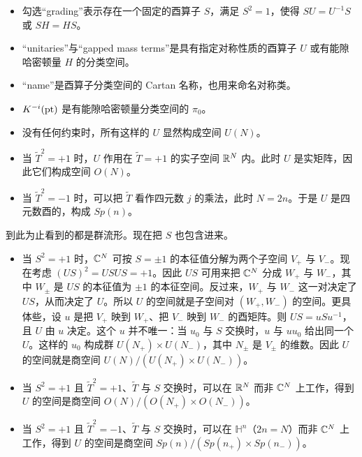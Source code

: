 \begin{itemize}
  \item 勾选“grading”表示存在一个固定的酉算子 $S$，满足 $S^2=1$，使得 $SU=U^{-1}S$ 或 $SH=HS$。
  \item “unitaries”与“gapped mass terms”是具有指定对称性质的酉算子 $U$ 或有能隙哈密顿量 $H$ 的分类空间。
  \item “name”是酉算子分类空间的 Cartan 名称，也用来命名对称类。
  \item $K^{-i}(\mathrm{pt})$ 是有能隙哈密顿量分类空间的 $\pi_0$。
\end{itemize}

\begin{itemize}
  \item 没有任何约束时，所有这样的 $U$ 显然构成空间 $U(N)$。
  \item 当 $\tilde T^2=+1$ 时，$U$ 作用在 $\tilde T=+1$ 的实子空间 $\mathbb{R}^N$ 内。此时 $U$ 是实矩阵，因此它们构成空间 $O(N)$。
  \item 当 $\tilde T^2=-1$ 时，可以把 $\tilde T$ 看作四元数 $j$ 的乘法，此时 $N=2n$。于是 $U$ 是四元数酉的，构成 $Sp(n)$。
\end{itemize}
到此为止看到的都是群流形。现在把 $S$ 也包含进来。
\begin{itemize}
  \item 当 $S^2=+1$ 时，$\mathbb{C}^N$ 可按 $S=\pm1$ 的本征值分解为两个子空间 $V_+$ 与 $V_-$。现在考虑 $(US)^2=USUS=+1$。因此 $US$ 可用来把 $\mathbb{C}^N$ 分成 $W_+$ 与 $W_-$，其中 $W_\pm$ 是 $US$ 的本征值为 $\pm1$ 的本征空间。反过来，$W_+$ 与 $W_-$ 这一对决定了 $US$，从而决定了 $U$。所以 $U$ 的空间就是子空间对 $(W_+,W_-)$ 的空间。更具体些，设 $u$ 是把 $V_+$ 映到 $W_+$、把 $V_-$ 映到 $W_-$ 的酉矩阵。则 $US=uSu^{-1}$，且 $U$ 由 $u$ 决定。这个 $u$ 并不唯一：当 $u_0$ 与 $S$ 交换时，$u$ 与 $uu_0$ 给出同一个 $U$。这样的 $u_0$ 构成群 $U(N_+)\times U(N_-)$，其中 $N_\pm$ 是 $V_\pm$ 的维数。因此 $U$ 的空间就是商空间 $U(N)/(U(N_+)\times U(N_-))$。
  \item 当 $S^2=+1$ 且 $\tilde T^2=+1$、$\tilde T$ 与 $S$ 交换时，可以在 $\mathbb{R}^N$ 而非 $\mathbb{C}^N$ 上工作，得到 $U$ 的空间是商空间 $O(N)/(O(N_+)\times O(N_-))$。
  \item 当 $S^2=+1$ 且 $\tilde T^2=-1$、$\tilde T$ 与 $S$ 交换时，可以在 $\mathbb{H}^n$（$2n=N$）而非 $\mathbb{C}^N$ 上工作，得到 $U$ 的空间是商空间 $Sp(n)/(Sp(n_+)\times Sp(n_-))$。
\end{itemize}

